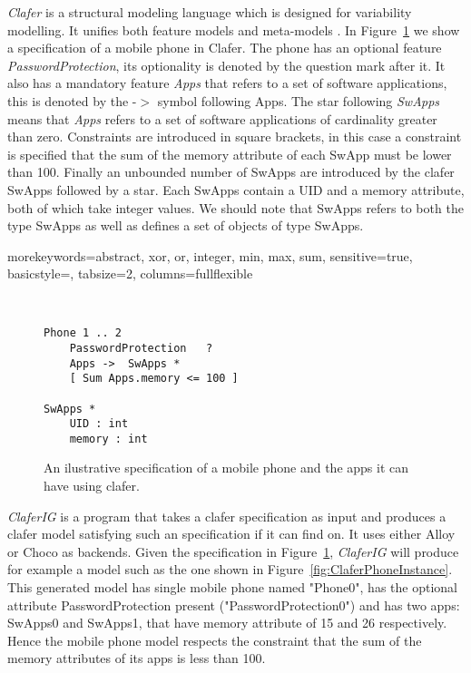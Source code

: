 \documentclass{article}
\newcommand{\figref}[1]{Figure~\ref{#1}}
\begin{document}
\emph{Clafer} is a structural modeling language which is designed for variability modelling. It unifies both feature models  and meta-models \cite{BakClaferSLE2010}.
%
In \figref{fig:ClaferPhone}  we show a specification of a mobile phone in Clafer. 
%
The phone has an optional feature \emph{PasswordProtection}, its optionality is denoted by the question mark after it. It also has a mandatory feature \emph{Apps} that refers  to a set of software applications, this is denoted by the  -$>$ symbol following  Apps. 
%
The star following  \emph{SwApps} means that \emph{Apps} refers to a set of software applications of cardinality greater than zero. 
%
Constraints are introduced in  square brackets, in this case a constraint is specified that the sum of the memory attribute of each SwApp must be lower than 100. 
%
Finally an unbounded number of SwApps are introduced by the clafer SwApps followed by a star. Each SwApps contain a UID and a memory attribute, both of which take integer values.  
%
We should note that SwApps refers to both the type SwApps as well as defines a set of objects of type SwApps.

{morekeywords={abstract, xor, or, integer, min, max, sum},
sensitive=true,
basicstyle={\sffamily\small},
tabsize=2,
columns=fullflexible
}

\begin{figure}[!t]
 \begin{lstlisting}[language=clafer]


Phone 1 .. 2
	PasswordProtection 	 ?
	Apps ->  SwApps *
	[ Sum Apps.memory <= 100 ]
	
SwApps * 
	UID : int
	memory : int
  \end{lstlisting}
 \caption{An ilustrative specification of a mobile phone and the apps it can have using clafer.}
 \label{fig:ClaferPhone}
\end{figure}


\emph{ClaferIG}  is a program that takes a clafer specification as input and produces a clafer model satisfying such an specification if it can find on. It uses either Alloy or Choco as backends. Given the specification in  \figref{fig:ClaferPhone}, \emph{ClaferIG}   will produce for example a model such as the one shown in \figref{fig:ClaferPhoneInstance}.  This generated model has single mobile phone named "Phone0", has the optional attribute PasswordProtection present ("PasswordProtection0") and has two apps: SwApps0 and SwApps1, that have memory attribute of 15 and 26 respectively. Hence the mobile phone model respects the constraint that the sum of the memory attributes of its apps is less than 100. 
\end{document}
